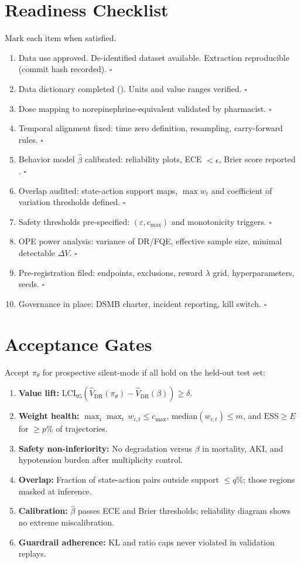 \documentclass[11pt]{article}
\newcommand{\cbox}{\(\square\)}
\newcommand{\ess}{\mathrm{ESS}}
\begin{document}
\section{Readiness Checklist}\label{sec:checklist}
Mark each item when satisfied.
\begin{enumerate}[leftmargin=*,itemsep=2pt]
  \item Data use approved. De-identified dataset available. Extraction reproducible (commit hash recorded). \cbox
  \item Data dictionary completed (). Units and value ranges verified. \cbox
  \item Dose mapping to norepinephrine-equivalent validated by pharmacist. \cbox
  \item Temporal alignment fixed: time zero definition, resampling, carry-forward rules. \cbox
  \item Behavior model $\hat\beta$ calibrated: reliability plots, ECE $<\epsilon$, Brier score reported \citep{guo2017calibration,brier1950}. \cbox
  \item Overlap audited: state-action support maps, $\max w_t$ and coefficient of variation thresholds defined. \cbox
  \item Safety thresholds pre-specified: $(\varepsilon,c_{\max})$ and monotonicity triggers. \cbox
  \item OPE power analysis: variance of DR/FQE, effective sample size, minimal detectable $\Delta V$. \cbox
  \item Pre-registration filed: endpoints, exclusions, reward $\lambda$ grid, hyperparameters, seeds. \cbox
  \item Governance in place: DSMB charter, incident reporting, kill switch. \cbox
\end{enumerate}

\section{Acceptance Gates}\label{sec:gates}
Accept $\pi_\theta$ for prospective silent-mode if all hold on the held-out test set:
\begin{enumerate}[leftmargin=*]
  \item \textbf{Value lift:} $\mathrm{LCI}_{95}(\hat V_{\mathrm{DR}}(\pi_\theta)-\hat V_{\mathrm{DR}}(\beta)) \geq \delta$.
  \item \textbf{Weight health:} $\max_i\max_t\, w_{i,t} \leq c_{\max}$, median$(w_{i,t}) \leq m$, and $\ess \geq E$ for $\geq p\%$ of trajectories.
  \item \textbf{Safety non-inferiority:} No degradation versus $\beta$ in mortality, AKI, and hypotension burden after multiplicity control.
  \item \textbf{Overlap:} Fraction of state-action pairs outside support $\leq q\%$; those regions masked at inference.
  \item \textbf{Calibration:} $\hat\beta$ passes ECE and Brier thresholds; reliability diagram shows no extreme miscalibration.
  \item \textbf{Guardrail adherence:} KL and ratio caps never violated in validation replays.
\end{enumerate}
\end{document}

